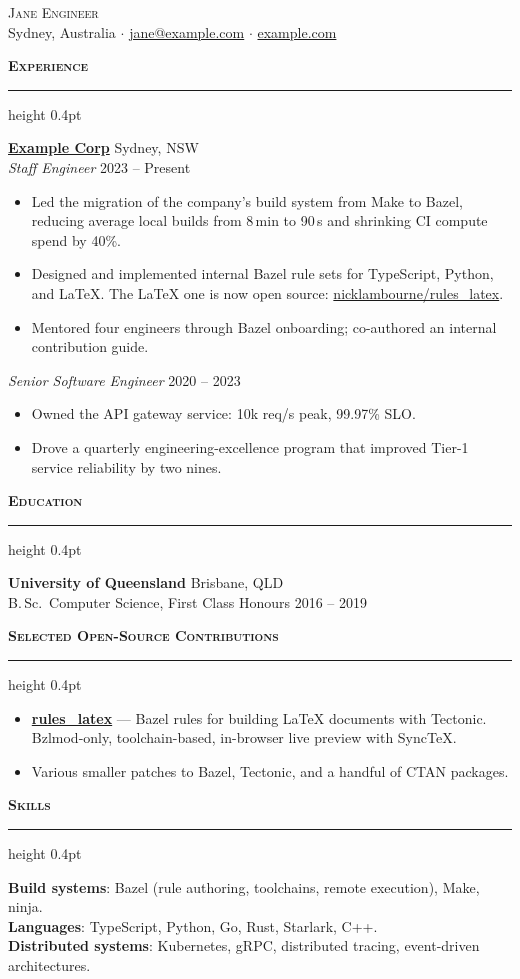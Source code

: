 \documentclass[a4paper,11pt]{article}
\newcommand{\header}[1]{%
    \vspace{4pt}%
    {\large\bfseries\scshape #1}%
    \hrule height 0.4pt%
    \vspace{2pt}%
}
\begin{document}
\begin{center}
    {\Huge\scshape Jane Engineer} \\[2pt]
    Sydney, Australia $\cdot$
    \href{mailto:jane@example.com}{jane@example.com} $\cdot$
    \href{https://example.com}{example.com}
\end{center}

\vspace{-6pt}

\header{Experience}

\textbf{\href{https://example.com}{Example Corp}} \hfill Sydney, NSW \\
\textit{Staff Engineer} \hfill 2023 -- Present
\begin{itemize}
    \item Led the migration of the company's build system from Make
        to Bazel, reducing average local builds from 8\,min to 90\,s
        and shrinking CI compute spend by 40\%.
    \item Designed and implemented internal Bazel rule sets for
        TypeScript, Python, and LaTeX. The LaTeX one is now open
        source: \href{https://github.com/nicklambourne/rules_latex}{nicklambourne/rules\_latex}.
    \item Mentored four engineers through Bazel onboarding;
        co-authored an internal contribution guide.
\end{itemize}

\textit{Senior Software Engineer} \hfill 2020 -- 2023
\begin{itemize}
    \item Owned the API gateway service: 10k req/s peak, 99.97\% SLO.
    \item Drove a quarterly engineering-excellence program that
        improved Tier-1 service reliability by two nines.
\end{itemize}

\header{Education}

\textbf{University of Queensland} \hfill Brisbane, QLD \\
B.\,Sc.~Computer Science, First Class Honours \hfill 2016 -- 2019

\header{Selected Open-Source Contributions}

\begin{itemize}
    \item \href{https://github.com/nicklambourne/rules_latex}{\textbf{rules\_latex}}
        --- Bazel rules for building LaTeX documents with Tectonic.
        Bzlmod-only, toolchain-based, in-browser live preview with
        SyncTeX.
    \item Various smaller patches to Bazel, Tectonic, and a handful
        of CTAN packages.
\end{itemize}

\header{Skills}

\textbf{Build systems}: Bazel (rule authoring, toolchains, remote
execution), Make, ninja. \\
\textbf{Languages}: TypeScript, Python, Go, Rust, Starlark, C++. \\
\textbf{Distributed systems}: Kubernetes, gRPC, distributed tracing,
event-driven architectures.
\end{document}
